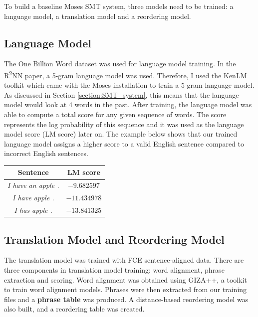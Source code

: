 \documentclass[12pt,a4paper,twoside]{report}
\begin{document}
To build a baseline Moses SMT system, three models need to be trained: a language model, a translation model and a reordering model.

\subsection{Language Model}\label{section:moses_lm}
The One Billion Word dataset was used for language model training. In the R\textsuperscript{2}NN paper, a 5-gram language model was used. Therefore, I used the KenLM toolkit which came with the Moses installation to train a 5-gram language model. As discussed in Section \ref{section:SMT_system}, this means that the language model would look at 4 words in the past. After training, the language model was able to compute a total score for any given sequence of words. The score represents the log probability of this sequence and it was used as the language model score (LM score) later on. The example below shows that our trained language model assigns a higher score to a valid English sentence compared to incorrect English sentences.

\begin{center}
\begin{tabular}{ c | c }
 \textbf{Sentence} & \textbf{LM score} \\
 \hline
 \textit{I have an apple .} & $-9.682597$ \\
 \textit{I have apple .} & $-11.434978$ \\
 \textit{I has apple .} & $-13.841325$
\end{tabular}
\end{center}

\subsection{Translation Model and Reordering Model}\label{section:moses_tm}
The translation model was trained with FCE sentence-aligned data. There are three components in translation model training: word alignment, phrase extraction and scoring. Word alignment was obtained using GIZA++, a toolkit to train word alignment models. Phrases were then extracted from our training files and a \textbf{phrase table} was produced. A distance-based reordering model was also built, and a reordering table was created.
\end{document}
